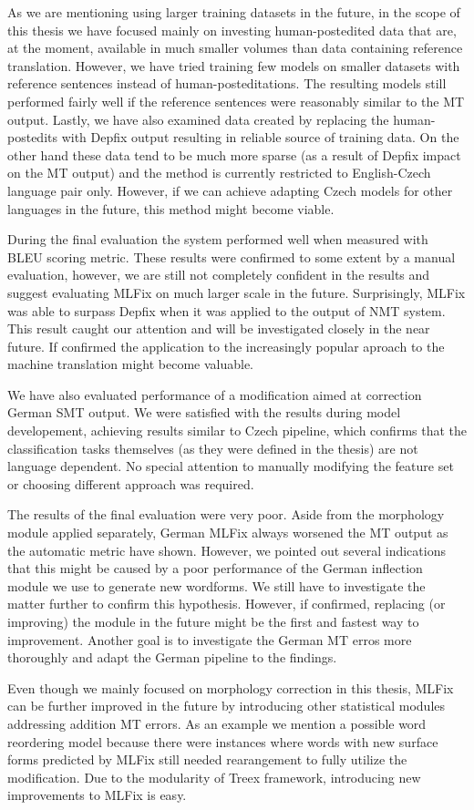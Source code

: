 As we are mentioning using larger training datasets in the future, in the scope of this thesis we have
focused mainly on investing human-postedited data that are, at the moment, available in much smaller
volumes than data containing reference translation. However, we have tried training few models on smaller
datasets with reference sentences instead of human-posteditations. The resulting models still performed
fairly well if the reference sentences were reasonably similar to the MT output. Lastly, we have
also examined data created by replacing the human-postedits with Depfix output resulting in reliable
source of training data. On the other hand these data tend to be much more sparse (as a result of Depfix
impact on the MT output) and the method is currently restricted to English-Czech language pair only.
However, if we can achieve adapting Czech models for other languages in the future, this method might
become viable.

During the final evaluation the system performed well when measured with BLEU scoring metric.
These results were confirmed to some extent by a manual evaluation, however, we are still not
completely confident in the results and suggest evaluating MLFix on much larger scale in the future.
Surprisingly, MLFix was able to surpass Depfix when it was applied to the output of NMT system.
This result caught our attention and will be investigated closely in the near future. If confirmed
the application to the increasingly popular aproach to the machine translation might become valuable.

We have also evaluated performance of a modification aimed at correction German SMT output. We were
satisfied with the results during model developement, achieving results similar to Czech pipeline,
which confirms that the classification tasks themselves (as they were defined in the thesis) are
not language dependent. No special attention to manually modifying the feature set or choosing
different approach was required.

The results of the final evaluation were very poor. Aside from the morphology module applied separately,
German MLFix always worsened the MT output as the automatic metric have shown. However, we pointed out
several indications that this might be caused by a poor performance of the German inflection module
we use to generate new wordforms. We still have to investigate the matter further to confirm this hypothesis.
However, if confirmed, replacing (or improving) the module in the future might be the first and fastest
way to improvement.
Another goal is to investigate the German MT erros more thoroughly and adapt the German pipeline to the findings.

Even though we mainly focused on morphology correction in this thesis, MLFix can be further improved
in the future by introducing other statistical modules addressing addition MT errors. As an example
we mention a possible word reordering model because there were instances where words with new surface
forms predicted by MLFix still needed rearangement to fully utilize the modification. Due to the modularity
of Treex framework, introducing new improvements to MLFix is easy.
